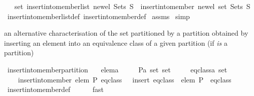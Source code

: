 \begin{isabellebody}
\ \ \ {\isachardoublequoteopen}set\ {\isacharparenleft}insert{\isacharunderscore}into{\isacharunderscore}member{\isacharunderscore}list\ new{\isacharunderscore}el\ Sets\ S{\isacharparenright}\ {\isacharequal}\ insert{\isacharunderscore}into{\isacharunderscore}member\ new{\isacharunderscore}el\ {\isacharparenleft}set\ Sets{\isacharparenright}\ S{\isachardoublequoteclose}\isanewline
%
\isadelimproof
%
\endisadelimproof
%
\isatagproof
{}\isamarkupfalse%
\ insert{\isacharunderscore}into{\isacharunderscore}member{\isacharunderscore}list{\isacharunderscore}def\ insert{\isacharunderscore}into{\isacharunderscore}member{\isacharunderscore}def\isanewline
{}\isamarkupfalse%
\ assms\isanewline
{}\isamarkupfalse%
\ simp%
\endisatagproof
{\isafoldproof}%
%
\isadelimproof
%
\endisadelimproof
%
\begin{isamarkuptext}%
an alternative characterisation of the set partitioned by a partition obtained by 
  inserting an element into an equivalence class of a given partition (if 
  \emph{is} a partition)%
\end{isamarkuptext}%
\isamarkuptrue%
\isamarkupfalse%
\ insert{\isacharunderscore}into{\isacharunderscore}member{\isacharunderscore}partition{}{\isacharcolon}\isanewline
\ \ \ elem{\isacharcolon}{\isacharcolon}{\isacharprime}a\isanewline
\ \ \ \ \ P{\isacharcolon}{\isacharcolon}{\isachardoublequoteopen}{\isacharprime}a\ set\ set{\isachardoublequoteclose}\isanewline
\ \ \ \ \ eq{\isacharunderscore}class{\isacharcolon}{\isacharcolon}{\isachardoublequoteopen}{\isacharprime}a\ set{\isachardoublequoteclose}\isanewline
\ \ \isanewline
\ \ \ {\isachardoublequoteopen}{\isasymUnion}\ insert{\isacharunderscore}into{\isacharunderscore}member\ elem\ P\ eq{\isacharunderscore}class\ {\isacharequal}\ {\isasymUnion}\ insert\ {\isacharparenleft}eq{\isacharunderscore}class\ {\isasymunion}\ {\isacharbraceleft}elem{\isacharbraceright}{\isacharparenright}\ {\isacharparenleft}P\ {\isacharminus}\ {\isacharbraceleft}eq{\isacharunderscore}class{\isacharbraceright}{\isacharparenright}{\isachardoublequoteclose}\isanewline
%
\isadelimproof
\isanewline
\ \ \ \ %
\endisadelimproof
%
\isatagproof
{}\isamarkupfalse%
\ insert{\isacharunderscore}into{\isacharunderscore}member{\isacharunderscore}def\isanewline
\ \ \ \ \isamarkupfalse%
\ fast%
\endisatagproof
{\isafoldproof}%
%
\isadelimproof
%
\endisadelimproof
%
\begin{isamarkuptext}%

\end{isamarkuptext}
\end{isabellebody}
